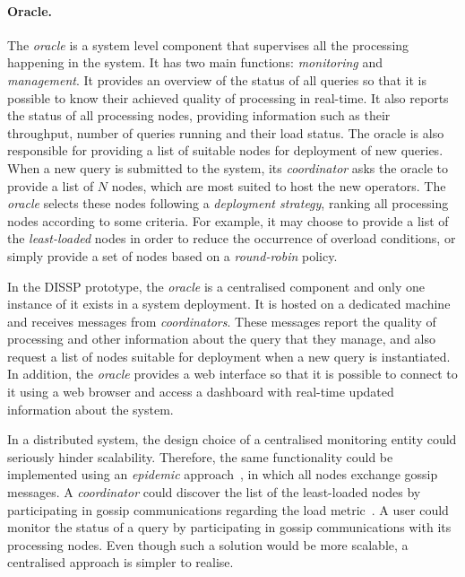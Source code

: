 \paragraph*{Oracle.}
The \emph{oracle} is a system level component that supervises all the processing happening in the
system.
It has two main functions: \emph{monitoring} and \emph{management}. It provides an overview of the
status of all queries so that it is possible to know their achieved quality of processing in real-time. It
also reports the status of all processing nodes, providing information such as their throughput, number
of queries running and their load status. The oracle is also responsible for providing a list of
suitable nodes for deployment of new queries. When a new query is submitted to the
system, its \emph{coordinator} asks the oracle to provide a list of $N$ nodes, which are most suited to
host the new operators.
The \emph{oracle} selects these nodes following a \emph{deployment strategy}, ranking all processing
nodes according to some criteria. For example, it may choose to provide a list of the
\emph{least-loaded} nodes in order to reduce the occurrence of overload conditions, or simply provide a
set of nodes based on a \emph{round-robin} policy.


In the DISSP prototype, the \emph{oracle} is a centralised component and only one instance of it exists
in a system deployment. It is hosted on a dedicated machine and receives messages from
\emph{coordinators}.
These messages report the quality of processing and other information about the query that they manage, and
also request a list of nodes suitable for deployment when a new query is instantiated.
In addition, the \emph{oracle} provides a web interface so that it is possible to connect to it
using a web browser and access a dashboard with real-time updated information about the system.

In a distributed system, the design choice of a
centralised monitoring entity could seriously hinder scalability. Therefore, the same functionality
could be implemented using an \emph{epidemic} approach~\cite{cyclon}, in which all nodes exchange
gossip messages. A \emph{coordinator} could discover the list
of the least-loaded nodes by participating in gossip communications regarding the load
metric~\cite{vicinity}. A user could monitor the status of a query by participating in gossip
communications with its processing nodes. Even though such a solution would be more scalable, a
centralised approach is simpler to realise.
